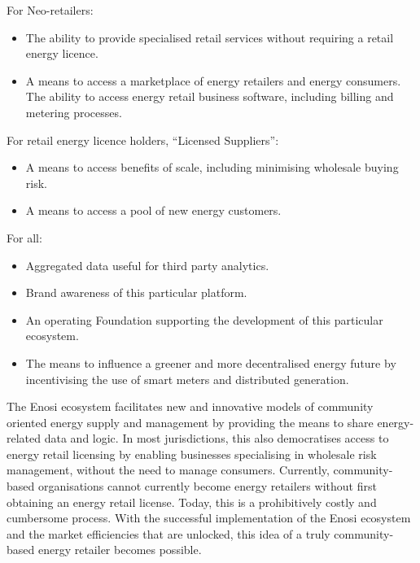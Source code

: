 \documentclass{article}
\theoremstyle{definition}
\theoremstyle{plain} %
\begin{document}
\noindent For Neo-retailers:

\begin{itemize}
\item{The ability to provide specialised retail services without requiring a retail energy licence.}
\item{A means to access a marketplace of energy retailers and energy consumers.
The ability to access energy retail business software, including billing and metering processes.\\}
\end{itemize}

\noindent For retail energy licence holders, “Licensed Suppliers”:

\begin{itemize}
\item{A means to access benefits of scale, including minimising wholesale buying risk.}
\item{A means to access a pool of new energy customers.\\}
\end{itemize}

\noindent For all:

\begin{itemize}
\item{Aggregated data useful for third party analytics.}
\item{Brand awareness of this particular platform.}
\item{An operating Foundation supporting the development of this particular ecosystem.}
\item{The means to influence a greener and more decentralised energy future by incentivising the use of smart meters and distributed generation.\\}
\end{itemize}

\noindent The Enosi ecosystem facilitates new and innovative models of community oriented energy supply and management by providing the means to share energy-related data and logic. In most jurisdictions, this also democratises access to energy retail licensing by enabling businesses specialising in wholesale risk management, without the need to manage consumers. Currently, community-based organisations cannot currently become energy retailers without first obtaining an energy retail license. Today, this is a prohibitively costly and cumbersome process. With the successful implementation of the Enosi ecosystem and the market efficiencies that are unlocked, this idea of a truly community-based energy retailer becomes possible.
\end{document}
